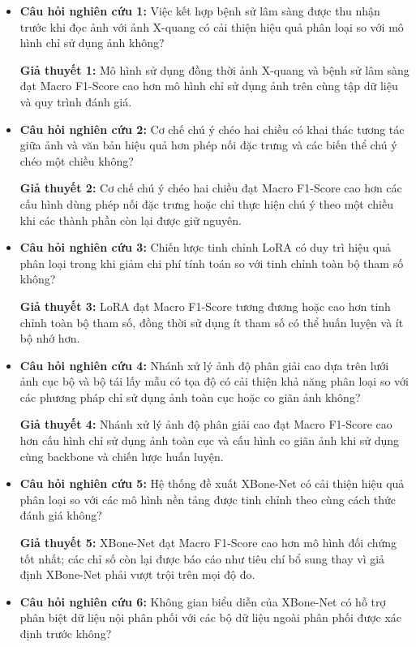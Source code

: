 \begin{itemize}
    \item \textbf{Câu hỏi nghiên cứu 1:} Việc kết hợp bệnh sử lâm sàng được thu nhận trước khi đọc ảnh với ảnh X-quang có cải thiện hiệu quả phân loại so với mô hình chỉ sử dụng ảnh không?
    
    \textbf{Giả thuyết 1:} Mô hình sử dụng đồng thời ảnh X-quang và bệnh sử lâm sàng đạt Macro F1-Score cao hơn mô hình chỉ sử dụng ảnh trên cùng tập dữ liệu và quy trình đánh giá.

    \item \textbf{Câu hỏi nghiên cứu 2:} Cơ chế chú ý chéo hai chiều có khai thác tương tác giữa ảnh và văn bản hiệu quả hơn phép nối đặc trưng và các biến thể chú ý chéo một chiều không?

    \textbf{Giả thuyết 2:} Cơ chế chú ý chéo hai chiều đạt Macro F1-Score cao hơn các cấu hình dùng phép nối đặc trưng hoặc chỉ thực hiện chú ý theo một chiều khi các thành phần còn lại được giữ nguyên.

    \item \textbf{Câu hỏi nghiên cứu 3:} Chiến lược tinh chỉnh LoRA có duy trì hiệu quả phân loại trong khi giảm chi phí tính toán so với tinh chỉnh toàn bộ tham số không?
    
    \textbf{Giả thuyết 3:} LoRA đạt Macro F1-Score tương đương hoặc cao hơn tinh chỉnh toàn bộ tham số, đồng thời sử dụng ít tham số có thể huấn luyện và ít bộ nhớ hơn.

    \item \textbf{Câu hỏi nghiên cứu 4:} Nhánh xử lý ảnh độ phân giải cao dựa trên lưới ảnh cục bộ và bộ tái lấy mẫu có tọa độ có cải thiện khả năng phân loại so với các phương pháp chỉ sử dụng ảnh toàn cục hoặc co giãn ảnh không?

    \textbf{Giả thuyết 4:} Nhánh xử lý ảnh độ phân giải cao đạt Macro F1-Score cao hơn cấu hình chỉ sử dụng ảnh toàn cục và cấu hình co giãn ảnh khi sử dụng cùng backbone và chiến lược huấn luyện.

    \item \textbf{Câu hỏi nghiên cứu 5:} Hệ thống đề xuất XBone-Net có cải thiện hiệu quả phân loại so với các mô hình nền tảng được tinh chỉnh theo cùng cách thức đánh giá không?
     
    \textbf{Giả thuyết 5:} XBone-Net đạt Macro F1-Score cao hơn mô hình đối chứng tốt nhất; các chỉ số còn lại được báo cáo như tiêu chí bổ sung thay vì giả định XBone-Net phải vượt trội trên mọi độ đo.

    \item \textbf{Câu hỏi nghiên cứu 6:} Không gian biểu diễn của XBone-Net có hỗ trợ phân biệt dữ liệu nội phân phối với các bộ dữ liệu ngoài phân phối được xác định trước không?


\end{itemize}
